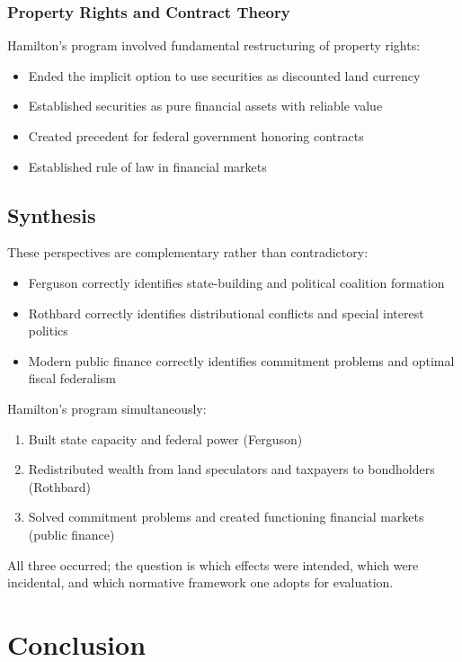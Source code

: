 \documentclass[12pt]{article}
\begin{document}
\subsubsection{Property Rights and Contract Theory}

Hamilton's program involved fundamental restructuring of property rights:
\begin{itemize}
\item Ended the implicit option to use securities as discounted land currency
\item Established securities as pure financial assets with reliable value
\item Created precedent for federal government honoring contracts
\item Established rule of law in financial markets
\end{itemize}

\subsection{Synthesis}

These perspectives are complementary rather than contradictory:
\begin{itemize}
\item Ferguson correctly identifies state-building and political coalition formation
\item Rothbard correctly identifies distributional conflicts and special interest politics
\item Modern public finance correctly identifies commitment problems and optimal fiscal federalism
\end{itemize}

Hamilton's program simultaneously:
\begin{enumerate}
\item Built state capacity and federal power (Ferguson)
\item Redistributed wealth from land speculators and taxpayers to bondholders (Rothbard)
\item Solved commitment problems and created functioning financial markets (public finance)
\end{enumerate}

All three occurred; the question is which effects were intended, which were incidental, and which normative framework one adopts for evaluation.

\section{Conclusion}\label{sec:conclusion}
\end{document}
